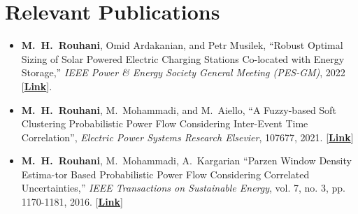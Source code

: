 \documentclass[11pt,a4paper,sans]{moderncv} %
\begin{document}
	\section{Relevant Publications}
	\begin{itemize}
		\item \textbf{M.~H.~Rouhani}, Omid Ardakanian, and Petr Musilek, ``Robust Optimal Sizing of Solar Powered Electric Charging Stations Co-located with Energy Storage,'' \textit{IEEE Power \&  Energy Society General Meeting (PES-GM)}, 2022 [\href{http://webdocs.cs.ualberta.ca/~oardakan/files/PESGM22.pdf}{\textbf{Link}}].
		
		
		\item \textbf{M.~H.~Rouhani}, M.~Mohammadi, and M.~Aiello, ``A Fuzzy-based Soft Clustering Probabilistic Power Flow Considering Inter-Event Time Correlation'', \textit{Electric Power Systems Research Elsevier}, 107677,  2021. [\href{https://www.sciencedirect.com/science/article/pii/S0378779621006581}{\textbf{Link}}]
		
		
		\item  \textbf{M.~H.~Rouhani}, M.~Mohammadi, A.~Kargarian ``Parzen Window Density Estima-tor Based Probabilistic Power Flow Considering Correlated Uncertainties,'' \textit{IEEE Transactions on Sustainable Energy}, vol. 7, no. 3, pp. 1170-1181, 2016. [\href{https://ieeexplore.ieee.org/abstract/document/7434076}{\textbf{Link}}]
		
	\end{itemize}
	
    			
\end{document}
